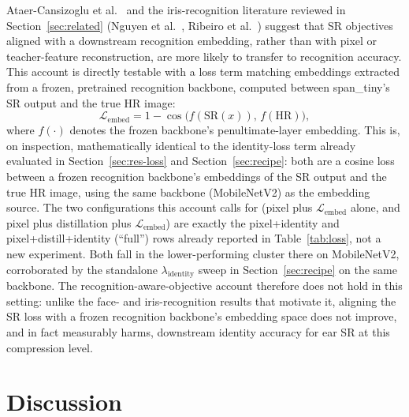 \documentclass[11pt]{article}
\begin{document}
Ataer-Cansizoglu et al.~\cite{ataer2019identity} and the iris-recognition literature reviewed in Section~\ref{sec:related} (Nguyen et al.~\cite{nguyen2011iris}, Ribeiro et al.~\cite{ribeiro2019iris}) suggest that SR objectives aligned with a downstream recognition embedding, rather than with pixel or teacher-feature reconstruction, are more likely to transfer to recognition accuracy. This account is directly testable with a loss term matching embeddings extracted from a frozen, pretrained recognition backbone, computed between span\_tiny's SR output and the true HR image:
\begin{equation}
\mathcal{L}_{\text{embed}} = 1 - \cos\big(f(\mathrm{SR}(x)),\, f(\mathrm{HR})\big),
\end{equation}
where $f(\cdot)$ denotes the frozen backbone's penultimate-layer embedding. This is, on inspection, mathematically identical to the identity-loss term already evaluated in Section~\ref{sec:res-loss} and Section~\ref{sec:recipe}: both are a cosine loss between a frozen recognition backbone's embeddings of the SR output and the true HR image, using the same backbone (MobileNetV2) as the embedding source. The two configurations this account calls for (pixel plus $\mathcal{L}_{\text{embed}}$ alone, and pixel plus distillation plus $\mathcal{L}_{\text{embed}}$) are exactly the pixel+identity and pixel+distill+identity (``full'') rows already reported in Table~\ref{tab:loss}, not a new experiment. Both fall in the lower-performing cluster there on MobileNetV2, corroborated by the standalone $\lambda_{\text{identity}}$ sweep in Section~\ref{sec:recipe} on the same backbone. The recognition-aware-objective account therefore does not hold in this setting: unlike the face- and iris-recognition results that motivate it, aligning the SR loss with a frozen recognition backbone's embedding space does not improve, and in fact measurably harms, downstream identity accuracy for ear SR at this compression level.

\section{Discussion}
\label{sec:discussion}
\end{document}
